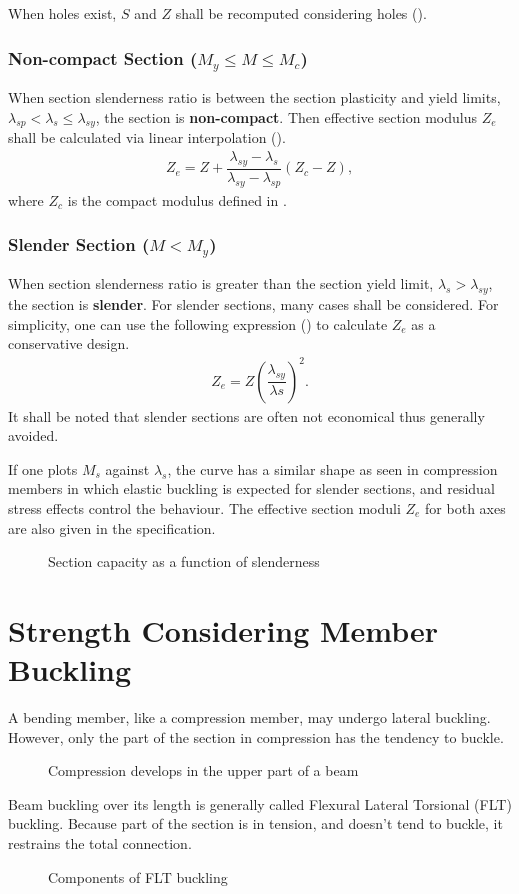 When holes exist, $S$ and $Z$ shall be recomputed considering holes ().
\subsubsection{Non-compact Section ($M_y\leqslant{}M\leqslant{}M_c$)}
When section slenderness ratio is between the section plasticity and yield limits, $\lambda_{sp}<\lambda_s\leqslant\lambda_{sy}$, the section is \textbf{non-compact}. Then effective section modulus $Z_e$ shall be calculated via linear interpolation ().
\begin{gather}
Z_e=Z+\dfrac{\lambda_{sy}-\lambda_s}{\lambda_{sy}-\lambda_{sp}}\left(Z_c-Z\right),
\end{gather}
where $Z_c$ is the compact modulus defined in .
\subsubsection{Slender Section ($M<M_y$)}
When section slenderness ratio is greater than the section yield limit, $\lambda_s>\lambda_{sy}$, the section is \textbf{slender}. For slender sections, many cases shall be considered. For simplicity, one can use the following expression () to calculate $Z_e$ as a conservative design.
\begin{gather}
Z_e=Z\left(\dfrac{\lambda_{sy}}{\lambda{s}}\right)^2.
\end{gather}
It shall be noted that slender sections are often not economical thus generally avoided.

If one plots $M_s$ against $\lambda_s$, the curve has a similar shape as seen in compression members in which elastic buckling is expected for slender sections, and residual stress effects control the behaviour. The effective section moduli $Z_e$ for both axes are also given in the specification.
\begin{figure}[H]
\centering\caption{Section capacity as a function of slenderness}
\end{figure}
\section{Strength Considering Member Buckling}
A bending member, like a compression member, may undergo lateral buckling. However, only the part of the section in compression has the tendency to buckle.
\begin{figure}[H]
\centering
\caption{Compression develops in the upper part of a beam}
\end{figure}
Beam buckling over its length is generally called Flexural Lateral Torsional (FLT) buckling. Because part of the section is in tension, and doesn't tend to buckle, it restrains the total connection.
\begin{figure}[H]
\centering\caption{Components of FLT buckling}
\end{figure}

